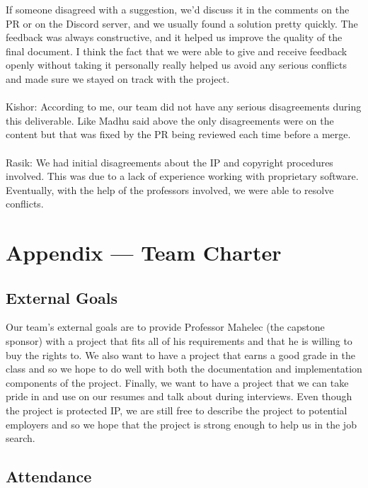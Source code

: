 \documentclass{article}
\begin{document}
\begin{enumerate}
        If someone disagreed with a suggestion, we’d discuss it in the comments on the PR or on the Discord server, and we usually found a solution pretty quickly. The feedback was always constructive, and it helped us improve the quality of the final document. I think the fact that we were able to give and receive feedback openly without taking it personally really helped us avoid any serious conflicts and made sure we stayed on track with the project.
    \\\\ Kishor: According to me, our team did not have any serious disagreements during this deliverable. Like Madhu said above the only disagreements were on the content but that was fixed by the PR being reviewed each time before a merge.
    \\\\ Rasik: We had initial disagreements about the IP and copyright procedures involved. This was due to a lack of experience working with proprietary software. Eventually, with the help of the professors involved, we were able to resolve conflicts. 
\end{enumerate}

\newpage{}

\section*{Appendix --- Team Charter}


\subsection*{External Goals}

Our team's external goals are to provide Professor Mahelec (the capstone sponsor) with a project that fits all of his requirements and that he is willing to buy the rights to. We also want to have a project that earns a good grade in the class and so we hope to do well with both the documentation and implementation components of the project. Finally, we want to have a project that we can take pride in and use on our resumes and talk about during interviews. Even though the project is protected IP, we are still free to describe the project to potential employers and so we hope that the project is strong enough to help us in the job search.

\subsection*{Attendance}
\end{document}
